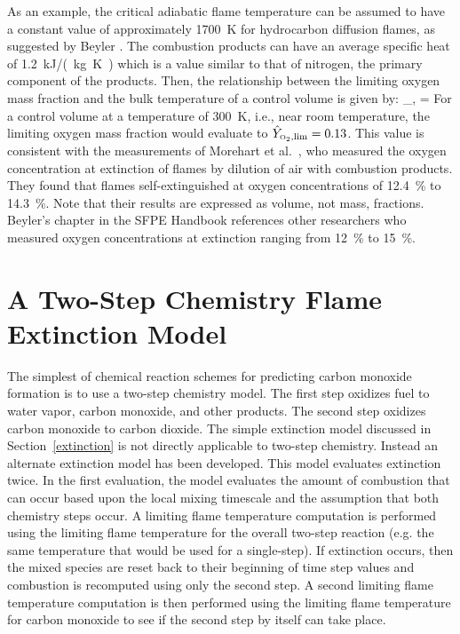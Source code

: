As an example, the critical adiabatic flame temperature can be assumed to have a constant value of approximately 1700~K for hydrocarbon diffusion flames, as suggested by Beyler \cite{SFPE:Beyler}. The combustion products can have an average specific heat of \SI{1.2}{kJ/(kg.K)} which is a value similar to that of nitrogen, the primary component of the products. Then, the relationship between the limiting oxygen mass fraction and the bulk temperature of a control volume is given by:
\be
   _{\OTWO,\lim} =  \approx  {}  \label{extinction_model}
\ee
For a control volume at a temperature of \SI{300}{K}, i.e., near room temperature, the limiting oxygen mass fraction would evaluate to $\hat{Y}_{\text{\tiny \hbox{O}$_2$},\lim}=0.13$.  This value is consistent with the measurements of Morehart et al.~\cite{Morehart:1991}, who measured the oxygen concentration at extinction of flames by dilution of air with combustion products. They found that flames self-extinguished at oxygen concentrations of 12.4~\% to 14.3~\%. Note that their results are expressed as volume, not mass, fractions. Beyler's chapter in the SFPE Handbook references other researchers who measured oxygen concentrations at extinction ranging from 12~\% to 15~\%.

\section{A Two-Step Chemistry Flame Extinction Model}
\label{co_based_model}

The simplest of chemical reaction schemes for predicting carbon monoxide formation is to use a two-step chemistry model. The first step oxidizes fuel to water vapor, carbon monoxide, and other products. The second step oxidizes carbon monoxide to carbon dioxide. The simple extinction model discussed in Section~\ref{extinction} is not directly applicable to two-step chemistry. Instead an alternate extinction model has been developed. This model evaluates extinction twice. In the first evaluation, the model evaluates the amount of combustion that can occur based upon the local mixing timescale and the assumption that both chemistry steps occur. A limiting flame temperature computation is performed using the limiting flame temperature for the overall two-step reaction (e.g. the same temperature that would be used for a single-step). If extinction occurs, then the mixed species are reset back to their beginning of time step values and combustion is recomputed using only the second step. A second limiting flame temperature computation is then performed using the limiting flame temperature for carbon monoxide to see if the second step by itself can take place.

